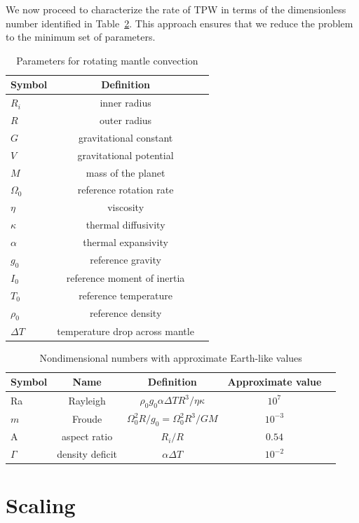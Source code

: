 \documentclass[preprint,12pt,authoryear]{elsarticle}
\begin{document}
We now proceed to characterize the rate of TPW in terms of the dimensionless number identified in Table~\ref{tab:nondim}. This approach ensures that we reduce the problem to the minimum set of parameters.



\begin{table}
\centering
\caption{Parameters for rotating mantle convection}
\label{tab:parameters}
\begin{tabular}{@{}lcc}
Symbol & Definition\\
\hline
$R_i$ & inner radius \\
$R$ & outer radius \\
$G$ & gravitational constant \\
$V$ & gravitational potential \\
$M$ & mass of the planet \\
$\Omega_0$ & reference rotation rate \\
$\eta$ & viscosity \\
$\kappa$ & thermal diffusivity \\
$\alpha$ &  thermal expansivity \\ 
$g_0$ & reference gravity \\
$I_0$ & reference moment of inertia \\
$T_0$ & reference temperature \\
$\rho_0$ & reference density \\ 
$\Delta T$ & temperature drop across mantle
\end{tabular}
\end{table}

\begin{table}
\centering
\caption{Nondimensional numbers with approximate Earth-like values}
\label{tab:nondim}
\begin{tabular}{@{}lcccc}
Symbol &  Name & Definition & Approximate value \\
\hline
Ra & Rayleigh &  $\rho_0 g_0 \alpha \Delta T R^3/\eta \kappa$ & $10^7$\\
$m$ & Froude & $\Omega_0^2 R/g_0 = \Omega_0^2 R^3/GM$ & $10^{-3}$ \\
A & aspect ratio & $R_i/R$ & $0.54$ \\
$\Gamma$ & density deficit &$ \alpha \Delta T$ & $10^{-2}$ \\
\end{tabular}
\end{table}
 
\section{Scaling}
\label{sec:scaling}
\end{document}

